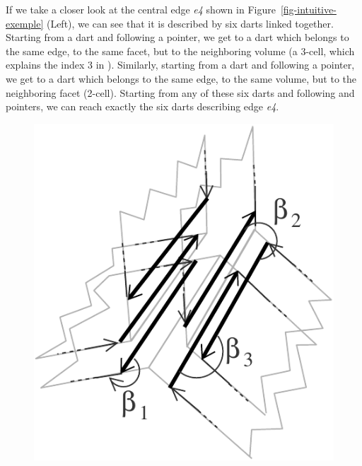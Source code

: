 If we take a closer look at the central edge \emph{e4} shown in
Figure~\ref{fig-intuitive-exemple} (Left), we can see that it is
described by six darts linked together.  Starting from a dart and
following a \betatrois{} pointer, we get to a dart which belongs to the
same edge, to the same facet, but to the neighboring volume (a 3-cell,
which explains the index 3 in \betatrois{}).  Similarly, starting from
a dart and following a \betadeux{} pointer, we get to a dart which
belongs to the same edge, to the same volume, but to the neighboring
facet (2-cell). Starting from any of these six darts and following
\betadeux{} and \betatrois{} pointers, we can reach exactly the six darts
describing edge \emph{e4}.
\def\LargFig{.3\textwidth}
\begin{figure}
  \begin{ccTexOnly}
    \begin{center}
      \includegraphics[width=\LargFig]{Combinatorial_map/fig/pdf/intuitif-example-zoom}

\end{center}
\end{ccTexOnly}
\end{figure}
